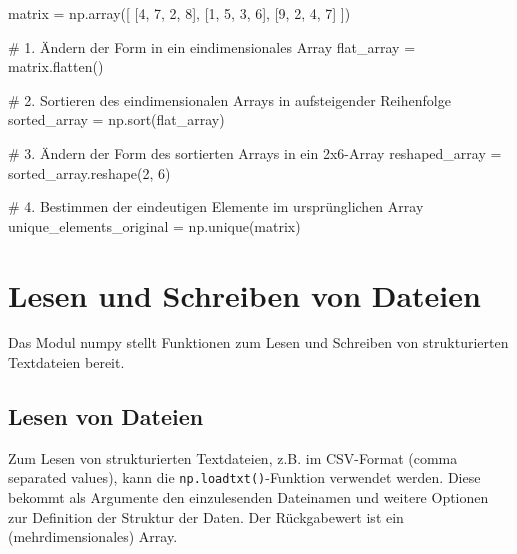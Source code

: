 \documentclass[
  letterpaper,
  DIV=11,
  numbers=noendperiod]{scrreprt}
\newenvironment{Shaded}{\begin{snugshade}}{\end{snugshade}}
\newcommand{\CommentTok}[1]{\textcolor[rgb]{0.37,0.37,0.37}{#1}}
\newcommand{\DecValTok}[1]{\textcolor[rgb]{0.68,0.00,0.00}{#1}}
\newcommand{\NormalTok}[1]{\textcolor[rgb]{0.00,0.23,0.31}{#1}}
\newcommand{\OperatorTok}[1]{\textcolor[rgb]{0.37,0.37,0.37}{#1}}
\begin{document}
\begin{tcolorbox}
\begin{tcolorbox}
\begin{tcolorbox}
\begin{Shaded}
\begin{Highlighting}[]
\NormalTok{matrix }\OperatorTok{=}\NormalTok{ np.array([}
\NormalTok{    [}\DecValTok{4}\NormalTok{, }\DecValTok{7}\NormalTok{, }\DecValTok{2}\NormalTok{, }\DecValTok{8}\NormalTok{],}
\NormalTok{    [}\DecValTok{1}\NormalTok{, }\DecValTok{5}\NormalTok{, }\DecValTok{3}\NormalTok{, }\DecValTok{6}\NormalTok{],}
\NormalTok{    [}\DecValTok{9}\NormalTok{, }\DecValTok{2}\NormalTok{, }\DecValTok{4}\NormalTok{, }\DecValTok{7}\NormalTok{]}
\NormalTok{])}

\CommentTok{\# 1. Ändern der Form in ein eindimensionales Array}
\NormalTok{flat\_array }\OperatorTok{=}\NormalTok{ matrix.flatten()}

\CommentTok{\# 2. Sortieren des eindimensionalen Arrays in aufsteigender Reihenfolge}
\NormalTok{sorted\_array }\OperatorTok{=}\NormalTok{ np.sort(flat\_array)}

\CommentTok{\# 3. Ändern der Form des sortierten Arrays in ein 2x6{-}Array}
\NormalTok{reshaped\_array }\OperatorTok{=}\NormalTok{ sorted\_array.reshape(}\DecValTok{2}\NormalTok{, }\DecValTok{6}\NormalTok{)}

\CommentTok{\# 4. Bestimmen der eindeutigen Elemente im ursprünglichen Array}
\NormalTok{unique\_elements\_original }\OperatorTok{=}\NormalTok{ np.unique(matrix)}
\end{Highlighting}
\end{Shaded}

\end{tcolorbox}

\end{tcolorbox}

\chapter{Lesen und Schreiben von
Dateien}\label{lesen-und-schreiben-von-dateien}

Das Modul numpy stellt Funktionen zum Lesen und Schreiben von
strukturierten Textdateien bereit.

\section{Lesen von Dateien}\label{lesen-von-dateien}

Zum Lesen von strukturierten Textdateien, z.B. im CSV-Format (comma
separated values), kann die \texttt{np.loadtxt()}-Funktion verwendet
werden. Diese bekommt als Argumente den einzulesenden Dateinamen und
weitere Optionen zur Definition der Struktur der Daten. Der Rückgabewert
ist ein (mehrdimensionales) Array.


\end{tcolorbox}
\end{document}
